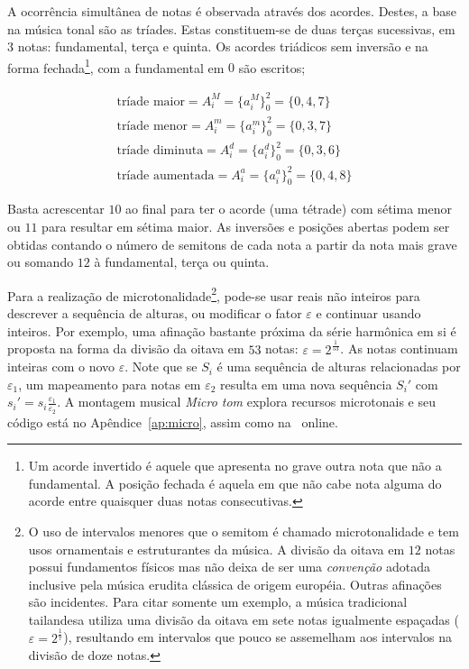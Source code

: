 A ocorrência simultânea de notas é observada através dos acordes. Destes, a base na música tonal são as tríades. Estas constituem-se de duas terças sucessivas, em 3 notas: fundamental, terça e quinta. Os acordes triádicos sem inversão e na forma fechada\footnote{Um acorde invertido é aquele que apresenta no grave outra nota que não a fundamental. A posição fechada é aquela em que não cabe nota alguma do acorde entre quaisquer duas notas consecutivas.\cite{Lacerda}},
com a fundamental em $0$ são escritos;

\begin{equation}\label{triades}
\begin{split}
\text{tríade maior} = A_i^M= \{a_i^M\}_0^2=\{0,4,7\} \\ 
\text{tríade menor} = A_i^m = \{a_i^m\}_0^2=\{0,3,7\} \\
\text{tríade diminuta} = A_i^d = \{a_i^d\}_0^2=\{0,3,6\} \\
\text{tríade aumentada} = A_i^a = \{a_i^a\}_0^2=\{0,4,8\}
\end{split}
\end{equation}

Basta acrescentar $10$ ao final para ter o acorde (uma tétrade)
com sétima menor ou $11$ para resultar em sétima maior. As inversões e posições abertas
podem ser obtidas contando o número de semitons de cada nota a partir da nota mais grave ou somando $12$ à fundamental, terça ou quinta.

Para a realização de microtonalidade\footnote{O uso de
intervalos menores que o semitom é chamado microtonalidade e tem usos
ornamentais e estruturantes da música. A
divisão da oitava em $12$ notas possui fundamentos físicos mas
não deixa de ser uma \emph{convenção}
adotada inclusive pela música erudita clássica de origem européia. Outras afinações
são incidentes. Para citar somente um exemplo, a
música tradicional tailandesa utiliza uma divisão da oitava em sete notas igualmente
espaçadas ($\varepsilon=2^{\frac{1}{7}}$),
resultando em intervalos que pouco se assemelham aos intervalos na
divisão de doze notas.\cite{Wisnick}},
pode-se usar reais não inteiros
para descrever a sequência de alturas, ou modificar o fator $\varepsilon$
e continuar usando inteiros. Por exemplo, uma afinação
bastante próxima da série harmônica em si
é proposta na forma da divisão da oitava em $53$ notas:
$\varepsilon=2^{\frac{1}{53}}$.\cite{microtonalidade}
As notas
continuam inteiras com o novo $\varepsilon$.
Note que se $S_i$ é uma sequência de alturas relacionadas por $\varepsilon_1$,
um mapeamento para notas em $\varepsilon_2$
resulta em uma nova sequência $S_i'$ com $s_i'=s_i \frac{\varepsilon_1}{\varepsilon_2}$. A montagem musical \emph{Micro tom} explora recursos microtonais e seu código está no Apêndice~\ref{ap:micro}, assim como na \massa\ online.


